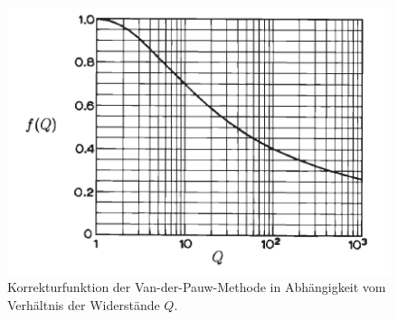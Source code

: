 	\begin{figure}[H]
		\centering
		\includegraphics[width=\linewidth]{Abb/f_Q.PNG}
		\caption{Korrekturfunktion der Van-der-Pauw-Methode in Abhängigkeit vom Verhältnis der Widerstände $Q$.}
		\label{f_Q}
	\end{figure}

